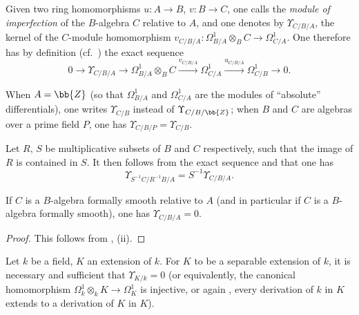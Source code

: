 \begin{definition}[20.6.1]
\label{0.20.6.1}
Given two ring homomorphisms $u:A\to B$, $v:B\to C$, one calls the \emph{module of imperfection} of the $B$-algebra $C$ relative to $A$, and one denotes by $\Upsilon_{C/B/A}$, the kernel of the $C$-module homomorphism $v_{C/B/A}:\Omega^1_{B/A}\otimes_B C\to\Omega^1_{C/A}$.
One therefore has by definition (cf.\ ) the exact sequence
\begin{equation}
\tag{20.6.1.1}
  \label{0.20.6.1.1}
  0\to\Upsilon_{C/B/A}\to\Omega^1_{B/A}\otimes_B C\xrightarrow{v_{C/B/A}}\Omega^1_{C/A}\xrightarrow{u_{C/B/A}}\Omega^1_{C/B}\to 0.
\end{equation}
\end{definition}

When $A=\bb{Z}$ (so that $\Omega^1_{B/A}$ and $\Omega^1_{C/A}$ are the modules of ``absolute'' differentials), one writes $\Upsilon_{C/B}$ instead of $\Upsilon_{C/B/\bb{Z}}$; when $B$ and $C$ are algebras over a prime field $P$, one has $\Upsilon_{C/B/P}=\Upsilon_{C/B}$.

Let $R$, $S$ be multiplicative subsets of $B$ and $C$ respectively, such that the image of $R$ is contained in $S$.
It then follows from the exact sequence  and  that one has
\begin{equation}
\tag{20.6.1.2}
  \label{0.20.6.1.2}
  \Upsilon_{S^{-1}C/R^{-1}B/A}=S^{-1}\Upsilon_{C/B/A}.
\end{equation}

\begin{proposition}[20.6.2]
\label{0.20.6.2}
If $C$ is a $B$-algebra formally smooth relative to $A$ \textup{(}and in particular if $C$ is a $B$-algebra formally smooth\textup{)}, one has $\Upsilon_{C/B/A}=0$.
\end{proposition}

\begin{proof}
This follows from , (ii).
\end{proof}

\begin{proposition}[20.6.3]
\label{0.20.6.3}
Let $k$ be a field, $K$ an extension of $k$.
For $K$ to be a separable extension of $k$, it is necessary and sufficient that $\Upsilon_{K/k}=0$ \textup{(}or equivalently, the canonical homomorphism $\Omega^1_k\otimes_k K\to\Omega^1_K$ is injective, or again , every derivation of $k$ in $K$ extends to a derivation of $K$ in $K$\textup{)}.
\end{proposition}

